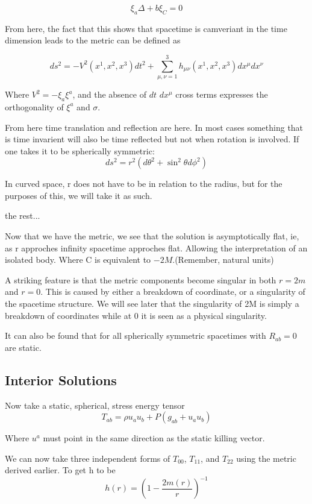 \[
\xi_{a}\Delta+b \xi_{C}=0
  \]

  From here, the fact that this shows that spacetime is camveriant in the time dimension leads to the metric can be defined as

\[
ds^2=-V^2(x^1,x^2,x^3)dt^2+ \sum_{\mu,\nu = 1}^3 h_{\mu \nu}(x^1,x^2,x^3)dx^\mu dx^\nu
  \]

  Where $V^2=-\xi_a \xi^a$, and the absence of $dt$ $dx^\mu$ cross terms expresses the orthogonality of $\xi^a$ and $\sigma$.

From here time translation and reflection are here. In most cases something that is time invarient will also be time reflected but not when rotation is involved. If one takes it to be spherically symmetric:
\[
    ds^2 = r^2(d\theta^2+\sin^2\theta d\phi^2)
  \]

  In curved space, r does not have to be in relation to the radius, but for the purposes of this, we will take it as such.


  the rest...



  Now that we have the metric, we see that the solution is asymptotically flat, ie, as r approches infinity spacetime approches flat. Allowing the interpretation of an isolated body. Where C is equivalent to $-2M$.(Remember, natural units)

  A striking feature is that the metric components become singular in both $r=2m$ and $r=0$. This is caused by either a breakdown of coordinate, or a singularity of the spacetime structure. We will see later that the singularity of 2M is simply a breakdown of coordinates while at 0 it is seen as a physical singularity.

  It can also be found that for all spherically symmetric spacetimes with $R_{ab}=0$ are static.

\subsection{Interior Solutions}

Now take a static, spherical, stress energy tensor
\[
T_{ab}= \rho u_a u_b + P(g_{ab}+u_au_b)
  \]

  Where $u^a$ must point in the same direction as the static killing vector.

  We can now take three independent forms of $T_{00}$, $T_{11}$, and $T_{22}$ using the metric derived earlier. To get h to be
\[
h(r)= \left(1- \frac{2m(r)}{r}   \right)^{-1}
  \]

